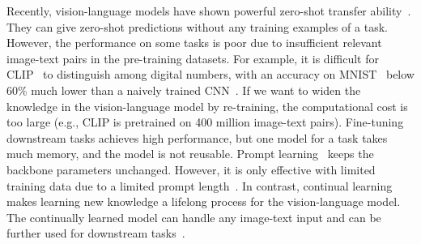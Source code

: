 Recently, vision-language models have shown powerful zero-shot transfer ability~\cite{radford2021learning, jia2021scaling, Li2022BLIPBL}. They can give zero-shot predictions without any training examples of a task.
However, the performance on some tasks is poor due to insufficient relevant image-text pairs in the pre-training datasets. For example, it is difficult for CLIP~\cite{radford2021learning} to distinguish among digital numbers, with an accuracy on MNIST~\cite{deng2012mnist} below 60\%
much lower than a naively trained CNN~\cite{lecun1998gradient}. If we want to widen the knowledge in the vision-language model by re-training, the computational cost is too large (e.g., CLIP is pretrained on 400 million image-text pairs). Fine-tuning downstream tasks achieves high performance, but one model for a task takes much memory, and the model is not reusable.
Prompt learning~\cite{zhou2022learning,zhou2022conditional} keeps the backbone parameters unchanged. However, it is only effective with limited training data due to a limited prompt length~\cite{zhou2022learning,jin2021good}.
In contrast, continual learning makes learning new knowledge a lifelong process for the vision-language model.
The continually learned model can handle any image-text input and can be further used for downstream tasks~\cite{ding2022don,thengane2022clip}. 

